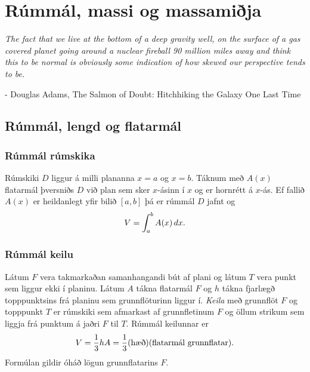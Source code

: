 \documentclass[a4paper,10pt,icelandic]{sphinxmanual}
\begin{document}
\chapter{Rúmmál, massi og massamiðja}
\label{kafli07::doc}\label{kafli07:rummal-massi-og-massamija}
\emph{The fact that we live at the bottom of a deep gravity well, on the surface of a
gas covered planet going around a nuclear fireball 90 million miles away and think
this to be normal is obviously some indication of how skewed our perspective tends to be.}

- Douglas Adams, The Salmon of Doubt: Hitchhiking the Galaxy One Last Time


\section{Rúmmál, lengd og flatarmál}
\label{kafli07:index-1}\label{kafli07:rummal-lengd-og-flatarmal}

\subsection{Rúmmál rúmskika}
\label{kafli07:rummal-rumskika}
Rúmskiki \(D\) liggur á milli plananna \(x=a\) og \(x=b\).
Táknum með \(A(x)\) flatarmál þversniðs \(D\) við plan sem sker
\(x\)-ásinn í \(x\) og er hornrétt á \(x\)-ás. Ef fallið
\(A(x)\) er heildanlegt yfir bilið \([a, b]\) þá er rúmmál
\(D\) jafnt og
\begin{gather}
\begin{split}V=\int_a^b A(x)\,dx.\end{split}\notag
\end{gather}

\subsection{Rúmmál keilu}
\label{kafli07:rummal-keilu}\label{kafli07:index-2}
Látum \(F\) vera takmarkaðan samanhangandi bút af plani og látum
\(T\) vera punkt sem liggur ekki í planinu. Látum \(A\) tákna
flatarmál \(F\) og \(h\) tákna fjarlægð topppunktsins frá
planinu sem grunnflöturinn liggur í. \textit{Keila} með grunnflöt \(F\) og
topppunkt \(T\) er rúmskiki sem afmarkast af grunnfletinum \(F\)
og öllum strikum sem liggja frá punktum á jaðri \(F\) til \(T\).
Rúmmál keilunnar er
\begin{gather}
\begin{split}V=\frac{1}{3}hA=\frac{1}{3}(\mbox{hæð})(\mbox{flatarmál
grunnflatar}).\end{split}\notag
\end{gather}
Formúlan gildir óháð lögun grunnflatarins \(F\).
\end{document}
